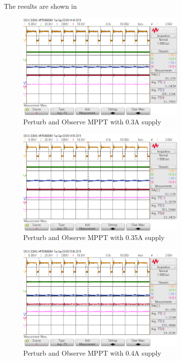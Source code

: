 \documentclass[]{article}
\begin{document}
 				The results are shown in 
 				\begin{figure}[H]
 					\centering
 					\includegraphics[width=0.75\textwidth]{Lab4Results/0_30A_Supply}
 					\caption{Perturb and Observe MPPT with 0.3A supply}
 					\label{fig:Lab4_0.3A}
 				\end{figure}
 				\begin{figure}[H]
 					\centering
 					\includegraphics[width=0.75\textwidth]{Lab4Results/0_35A_Supply}
 					\caption{Perturb and Observe MPPT with 0.35A supply}
 					\label{fig:Lab4_0.35A}
 				\end{figure}
 				\begin{figure}[H]
 					\centering
 					\includegraphics[width=0.75\textwidth]{Lab4Results/0_40A_Supply}
 					\caption{Perturb and Observe MPPT with 0.4A supply}
 					\label{fig:Lab4_0.4A}
 				\end{figure}
\end{document}
